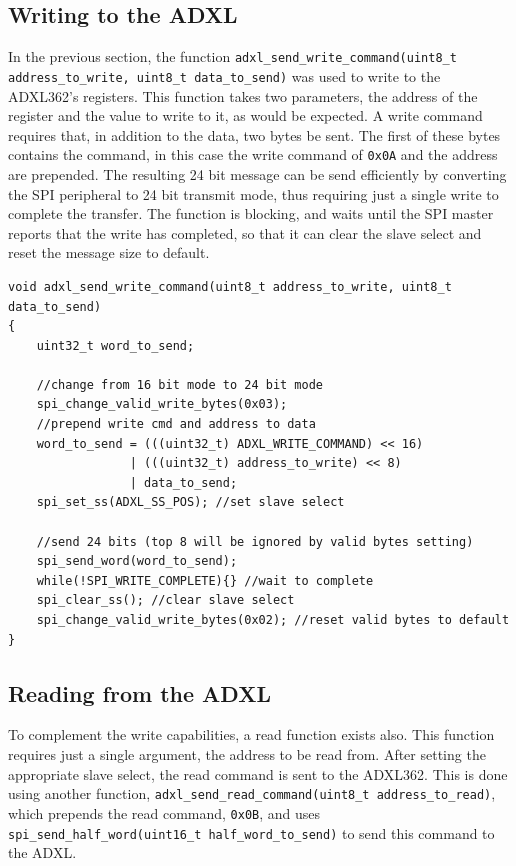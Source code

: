 \documentclass[11pt,british]{report}
\begin{document}
\subsection*{Writing to the ADXL}
In the previous section, the function \lstinline[style={c-style}]|adxl_send_write_command(uint8_t address_to_write, uint8_t data_to_send)| was used to write to the ADXL362's registers. This function takes two parameters, the address of the register and the value to write to it, as would be expected. A write command requires that, in addition to the data, two bytes be sent. The first of these bytes contains the command, in this case the write command of \texttt{0x0A} and the address are prepended. The resulting 24 bit message can be send efficiently by converting the SPI peripheral to 24 bit transmit mode, thus requiring just a single write to complete the transfer. The function is blocking, and waits until the SPI master reports that the write has completed, so that it can clear the slave select and reset the message size to default.
\begin{lstlisting}[style={c-style}]
void adxl_send_write_command(uint8_t address_to_write, uint8_t data_to_send)
{
	uint32_t word_to_send;
	
	//change from 16 bit mode to 24 bit mode
	spi_change_valid_write_bytes(0x03);
	//prepend write cmd and address to data
	word_to_send = (((uint32_t) ADXL_WRITE_COMMAND) << 16)
	             | (((uint32_t) address_to_write) << 8)
	             | data_to_send; 
	spi_set_ss(ADXL_SS_POS); //set slave select
	
	//send 24 bits (top 8 will be ignored by valid bytes setting)
	spi_send_word(word_to_send);
	while(!SPI_WRITE_COMPLETE){} //wait to complete
	spi_clear_ss(); //clear slave select
	spi_change_valid_write_bytes(0x02); //reset valid bytes to default
}
\end{lstlisting}

\subsection*{Reading from the ADXL}
To complement the write capabilities, a read function exists also. This function requires just a single argument, the address to be read from. After setting the appropriate slave select, the read command is sent to the ADXL362. This is done using another function, \lstinline[style={c-style}]|adxl_send_read_command(uint8_t address_to_read)|, which prepends the read command, \texttt{0x0B}, and uses \lstinline[style={c-style}]|spi_send_half_word(uint16_t half_word_to_send)| to send this command to the ADXL.
\end{document}
